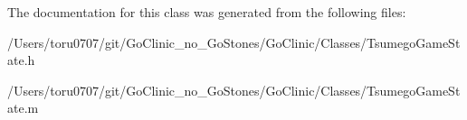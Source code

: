 The documentation for this class was generated from the following files:\begin{DoxyCompactItemize}
\item 
/Users/toru0707/git/GoClinic\_\-no\_\-GoStones/GoClinic/Classes/TsumegoGameState.h\item 
/Users/toru0707/git/GoClinic\_\-no\_\-GoStones/GoClinic/Classes/TsumegoGameState.m\end{DoxyCompactItemize}

